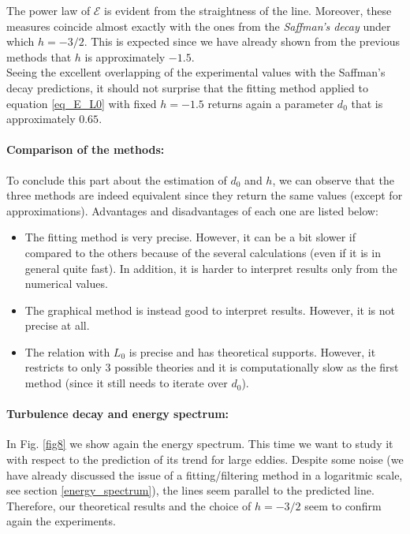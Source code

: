 \documentclass[11pt,titlepage]{article}
\begin{document}
The power law of $\mathcal{E}$ is evident from the straightness of the line. Moreover, these measures coincide almost exactly with the ones from the \emph{Saffman's decay} under which $h=-3/2$. This is expected since we have already shown from the previous methods that $h$ is approximately $-1.5$. \\
Seeing the excellent overlapping of the experimental values with the Saffman's decay predictions, it should not surprise that the fitting method applied  to equation \ref{eq_E_L0} with fixed $h=-1.5$ returns again a parameter $d_0$ that is approximately $0.65$. 

\paragraph{Comparison of the methods:}
To conclude this part about the estimation of $d_0$ and $h$, we can observe that the three methods are indeed equivalent since they return the same values (except for approximations). Advantages and disadvantages of each one are listed below:
\begin{itemize}
	\item The fitting method is very precise. However, it can be a bit slower if compared to the others because of the several calculations (even if it is in general quite fast). In addition, it is harder to interpret results only from the numerical values.
	\item The graphical method is instead good to interpret results. However, it is not precise at all. 
	\item The relation with $L_0$ is precise and has theoretical supports. However, it restricts to only 3 possible theories and it is computationally slow as the first method (since it still needs to iterate over $d_0$).
\end{itemize}

\paragraph{Turbulence decay and energy spectrum: } 
 In Fig. \ref{fig8} we show again the energy spectrum. This time we want to study it with respect to the prediction of its trend for large eddies. Despite some noise (we have already discussed the issue of a fitting/filtering method in a logaritmic scale, see section \ref{energy_spectrum}), the lines seem parallel to the predicted line. Therefore, our theoretical results and the choice of $h=-3/2$ seem to confirm again the experiments.
 
\end{document}
